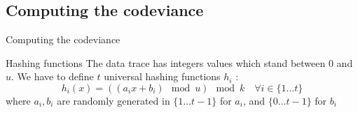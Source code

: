\documentclass[mathserif]{beamer}
\begin{document}
	\subsection{Computing the codeviance}
	
	\begin{frame}{Computing the codeviance}
	
	\begin{block}{Hashing functions}
	The data trace has integers values which stand between $0$ and $u$. We have to define $t$ universal hashing functions $h_i$ :
	\[ h_i(x) = ((a_ix+b_i) \mod u) \mod k \quad \forall i \in \lbrace 1 \ldots t \rbrace \]
where $a_i, b_i$ are randomly generated in $\lbrace 1 \dots t-1 \rbrace$ for $a_i$, and $\lbrace 0 \ldots t-1 \rbrace$ for $b_i$
	\end{block}
	
	\end{frame}
	
\end{document}
